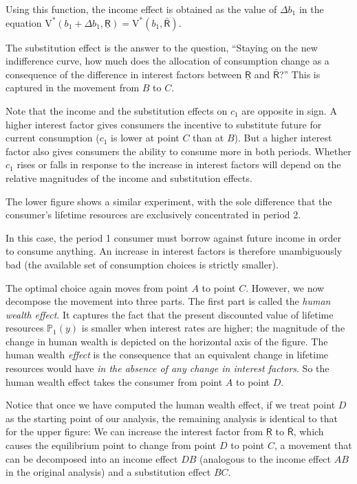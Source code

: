 \documentclass{scrartcl}
\begin{document}
  Using this function, the income effect is obtained as the value of $\Delta \boldsymbol{\mathit{b}}_{1}$ in the equation $\mathrm{V}^{*}(\boldsymbol{\mathit{b}}_{1}+\Delta \boldsymbol{\mathit{b}}_{1},\underline{\mathsf{R}})=\mathrm{V}^{*}(\boldsymbol{\mathit{b}}_{1},\bar{\mathsf{R}})$.

  The substitution effect is the answer to the question, ``Staying on the new indifference curve, how much does the allocation of consumption change as a consequence of the difference in interest factors between $\underline{\mathsf{R}}$ and $\bar{\mathsf{R}}$?''  This is captured in the movement from $B$ to $C$.

  Note that the income and the substitution effects on $\boldsymbol{\mathit{c}}_{1}$ are opposite in sign.  A higher interest factor gives consumers the incentive to substitute future for current consumption ($\boldsymbol{\mathit{c}}_{1}$ is lower at point $C$ than at $B$).  But a higher interest factor also gives consumers the ability to consume more in both periods.  Whether $\boldsymbol{\mathit{c}}_{1}$ rises or falls in response to the increase in interest factors will depend on the relative magnitudes of the income and substitution effects.

  The lower figure shows a similar experiment, with the sole difference that the consumer's lifetime resources are exclusively concentrated in period 2.

  In this case, the period 1 consumer must borrow against future income in order to consume anything.  An increase in interest factors is therefore unambiguously bad (the available set of consumption choices is strictly smaller).

  The optimal choice again moves from point $A$ to point $C$.  However, we now decompose the movement into three parts.  The first part is called the \textit{human wealth effect}.  It captures the fact that the present discounted value of lifetime resources ${\mathbb{P}}_{1}(y)$ is smaller when interest rates are higher; the magnitude of the change in human wealth is depicted on the horizontal axis of the figure.  The human wealth \textit{effect} is the consequence that an equivalent change in lifetime resources would have \textit{in the absence of any change in interest factors}.  So the human wealth effect takes the consumer from point $A$ to point $D$.

  Notice that once we have computed the human wealth effect, if we treat point $D$ as the starting point of our analysis, the remaining analysis is identical to that for the upper figure: We can increase the interest factor from $\underline{\mathsf{R}}$ to $\bar{\mathsf{R}}$, which causes the equilibrium point to change from point $D$ to point $C$, a movement that can be decomposed into an income effect $DB$ (analogous to the income effect $AB$ in the original analysis) and a substitution effect $BC$.
\end{document}
